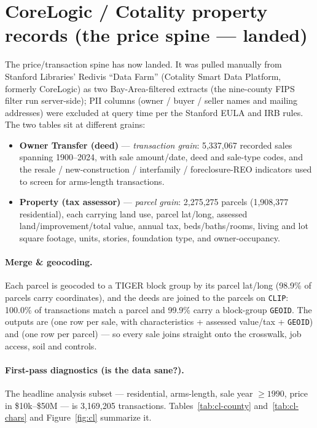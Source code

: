 \documentclass[11pt]{article}
\newcommand{\CLNTX}{5,337,067}               %
\newcommand{\CLNPARCEL}{2,275,275}           %
\newcommand{\CLNRESPARCEL}{1,908,377}        %
\newcommand{\CLNANALYSIS}{3,169,205}         %
\newcommand{\CLGEORATE}{99.9\%}           %
\newcommand{\CLMATCHRATE}{100.0\%}         %
\newcommand{\CLYEARMIN}{1900}
\newcommand{\CLYEARMAX}{2024}
\begin{document}
\section{CoreLogic / Cotality property records (the price spine --- landed)}\label{sec:corelogic}
The price/transaction spine has now landed. It was pulled manually from
Stanford Libraries' Redivis ``Data Farm'' (Cotality Smart Data Platform,
formerly CoreLogic) as two Bay-Area-filtered extracts (the nine-county FIPS
filter run server-side); PII columns (owner / buyer / seller names and mailing
addresses) were excluded at query time per the Stanford EULA and IRB rules. The
two tables sit at different grains:
\begin{itemize}[leftmargin=1.5em, itemsep=1pt]
\item \textbf{Owner Transfer (deed)} --- \emph{transaction grain}: \CLNTX{}
  recorded sales spanning \CLYEARMIN--\CLYEARMAX, with sale amount/date, deed and
  sale-type codes, and the resale / new-construction / interfamily / foreclosure-REO
  indicators used to screen for arms-length transactions.
\item \textbf{Property (tax assessor)} --- \emph{parcel grain}: \CLNPARCEL{}
  parcels (\CLNRESPARCEL{} residential), each carrying land use, parcel lat/long,
  assessed land/improvement/total value, annual tax, beds/baths/rooms, living and
  lot square footage, units, stories, foundation type, and owner-occupancy.
\end{itemize}

\paragraph{Merge \& geocoding.} Each parcel is geocoded to a TIGER block group by
its parcel lat/long (98.9\% of parcels carry coordinates), and the deeds are
joined to the parcels on \texttt{CLIP}: \CLMATCHRATE{} of transactions match a
parcel and \CLGEORATE{} carry a block-group \texttt{GEOID}. The outputs are
 (one row per sale, with
characteristics + assessed value/tax + \texttt{GEOID}) and
 (one row per parcel) --- so
every sale joins straight onto the crosswalk, job access, soil and controls.

\paragraph{First-pass diagnostics (is the data sane?).} The headline analysis
subset --- residential, arms-length, sale year $\geq 1990$, price in
\$10k--\$50M --- is \CLNANALYSIS{} transactions. Tables~\ref{tab:cl-county}
and~\ref{tab:cl-chars} and Figure~\ref{fig:cl} summarize it.
\end{document}
